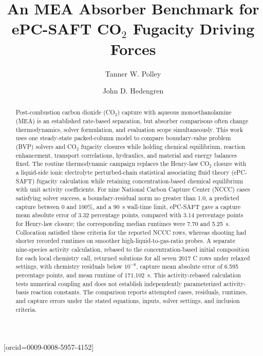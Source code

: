 \documentclass[a4paper,fleqn]{cas-sc}
\begin{document}
    \def\floatpagepagefraction{1}
    \def\textpagefraction{.001}


    \title[mode = title]{An MEA Absorber Benchmark for ePC-SAFT \texorpdfstring{CO$_2$}{CO2} Fugacity Driving Forces}

    \author[1]{Tanner W. Polley}[orcid=0009-0008-5957-4152]

    \author[1]{John D. Hedengren}
    \cormark[1]



    \begin{abstract}
        Post-combustion carbon dioxide (CO$_2$) capture with aqueous monoethanolamine (MEA) is an established rate-based separation, but absorber comparisons often change thermodynamics, solver formulation, and evaluation scope simultaneously. This work uses one steady-state packed-column model to compare boundary-value problem (BVP) solvers and CO$_2$ fugacity closures while holding chemical equilibrium, reaction enhancement, transport correlations, hydraulics, and material and energy balances fixed. The routine thermodynamic campaign replaces the Henry-law CO$_2$ closure with a liquid-side ionic electrolyte perturbed-chain statistical associating fluid theory (ePC-SAFT) fugacity calculation while retaining concentration-based chemical equilibrium with unit activity coefficients. For nine National Carbon Capture Center (NCCC) cases satisfying solver success, a boundary-residual norm no greater than 1.0, a predicted capture between 0 and 100\%, and a \SI{90}{s} wall-time limit, ePC-SAFT gave a capture mean absolute error of 3.32 percentage points, compared with 3.14 percentage points for Henry-law closure; the corresponding median runtimes were 7.70 and \SI{5.25}{s}. Collocation satisfied these criteria for the reported NCCC rows, whereas shooting had shorter recorded runtimes on smoother high-liquid-to-gas-ratio probes. A separate nine-species activity calculation, rebased to the concentration-based initial composition for each local chemistry call, returned solutions for all seven 2017 C rows under relaxed settings, with chemistry residuals below $10^{-8}$, capture mean absolute error of 6.595 percentage points, and mean runtime of \SI{171.102}{s}. This activity-rebased calculation tests numerical coupling and does not establish independently parameterized activity-basis reaction constants. The comparison reports attempted cases, residuals, runtimes, and capture errors under the stated equations, inputs, solver settings, and inclusion criteria.
    \end{abstract}
\end{document}
